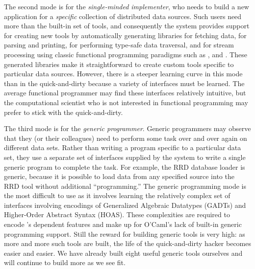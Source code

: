 The second mode is
for the {\em single-minded implementer}, who needs to build a new
application for a {\em specific} collection of distributed data
sources.  Such users need more than the built-in set of tools, 
and consequently the system provides support for
creating new tools by automatically generating libraries for fetching
data, for parsing and printing, for performing type-safe data
traversal, and for stream processing using classic functional
programming paradigms such as ,  and .
These generated libraries make it straightforward to create custom tools
specific to particular data sources.  However, there is a steeper learning
curve in this mode than in the quick-and-dirty because a variety of
interfaces must be learned.  The average functional programmer may find
these interfaces relatively intuitive, but the computational scientist
who is not interested in functional programming may prefer to stick with
the quick-and-dirty. 

The third mode is for the {\em generic programmer}.  Generic
programmers may observe that they (or their colleagues) 
need to perform some task over and over again on different
data sets.  Rather than writing a program specific to a particular
data set, they use a 
separate set of interfaces supplied by the \padsd{} system to write a
single generic program to complete the task.  For example, the RRD database
loader is generic, because it is possible to load data from any
specified source into the RRD tool without additional ``programming.''
The generic programming mode is the most difficult to use as it involves
learning the relatively complex set of interfaces involving encodings
of Generalized Algebraic Datatypes (GADTs) and Higher-Order Abstract Syntax 
(HOAS).  These complexities are required to encode \padsd{}'s dependent features and make up for O'Caml's lack of built-in generic programming support.
Still the reward for building generic tools is very high:
as more and more such tools are built, the life of the quick-and-dirty
hacker becomes easier and easier.  We have already built eight useful
generic tools ourselves and will continue to build more as we see fit.



